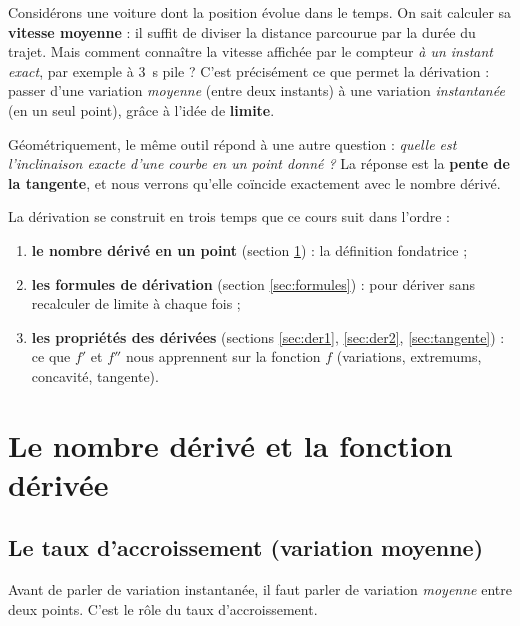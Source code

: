 \documentclass[11pt,a4paper]{article}
\begin{document}
Considérons une voiture dont la position évolue dans le temps. On sait calculer sa
\textbf{vitesse moyenne} : il suffit de diviser la distance parcourue par la durée du trajet. Mais
comment connaître la vitesse affichée par le compteur \emph{à un instant exact}, par exemple à
\qty{3}{\second} pile ? C'est précisément ce que permet la dérivation : passer d'une variation
\emph{moyenne} (entre deux instants) à une variation \emph{instantanée} (en un seul point), grâce à
l'idée de \textbf{limite}.

Géométriquement, le même outil répond à une autre question : \emph{quelle est l'inclinaison exacte
d'une courbe en un point donné ?} La réponse est la \textbf{pente de la tangente}, et nous verrons
qu'elle coïncide exactement avec le nombre dérivé.

\begin{remarque}
La dérivation se construit en trois temps que ce cours suit dans l'ordre :
\begin{enumerate}[leftmargin=1.8em,topsep=2pt,itemsep=1pt]
  \item \textbf{le nombre dérivé en un point} (section \ref{sec:nombre}) : la définition fondatrice ;
  \item \textbf{les formules de dérivation} (section \ref{sec:formules}) : pour dériver sans recalculer
        de limite à chaque fois ;
  \item \textbf{les propriétés des dérivées} (sections \ref{sec:der1}, \ref{sec:der2}, \ref{sec:tangente}) :
        ce que $f'$ et $f''$ nous apprennent sur la fonction $f$ (variations, extremums, concavité, tangente).
\end{enumerate}
\end{remarque}

\section{Le nombre dérivé et la fonction dérivée}
\label{sec:nombre}

\subsection{Le taux d'accroissement (variation moyenne)}

Avant de parler de variation instantanée, il faut parler de variation \emph{moyenne} entre deux
points. C'est le rôle du taux d'accroissement.
\end{document}

